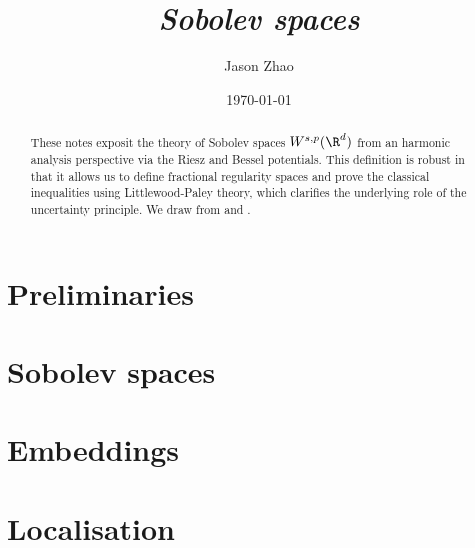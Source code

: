 \documentclass[reqno]{amsart}
\title
{
	\emph{Sobolev spaces}
}
\author{Jason Zhao}
\date{\today}
\theoremstyle{definition}
\theoremstyle{remark}
\begin{document}
\maketitle

\begin{abstract}
	These notes exposit the theory of Sobolev spaces $W^{s, p} (\R^d)$ from an harmonic analysis perspective via the Riesz and Bessel potentials. This definition is robust in that it allows us to define fractional regularity spaces and prove the classical inequalities using Littlewood-Paley theory, which clarifies the underlying role of the uncertainty principle. We draw from \cite[Chapter III]{Stein16} and \cite[Appendix A]{Tao2006}.
\end{abstract}

\tableofcontents

\section{Preliminaries}


\section{Sobolev spaces}


\section{Embeddings}


\section{Localisation}




\end{document}
